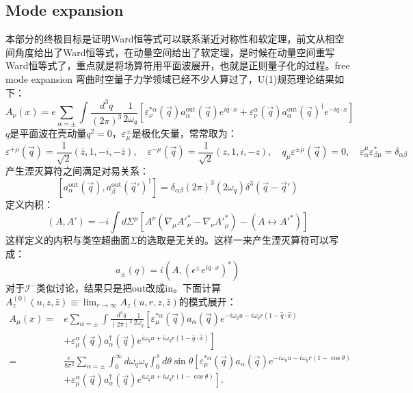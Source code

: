 \subsection{Mode expansion}
本部分的终极目标是证明Ward恒等式可以联系渐近对称性和软定理，前文从相空间角度给出了Ward恒等式，在动量空间给出了软定理，是时候在动量空间重写Ward恒等式了，重点就是将场算符用平面波展开，也就是正则量子化的过程。free mode expansion 弯曲时空量子力学领域已经不少人算过了，U(1)规范理论结果如下：
\begin{equation}
	A_{\nu}(x)=e\sum_{\alpha=\pm}\int\frac{d^3q}{\left(2\pi\right)^3}\frac{1}{2\omega_q}\left[\varepsilon_{\nu}^{*\alpha}(\vec{q})a_{\alpha}^{\mathrm{out}}(\vec{q})e^{iq\cdot x}+\varepsilon_{\nu}^{\alpha}(\vec{q})a_{\alpha}^{\mathrm{out}}(\vec{q})^\dagger e^{-iq\cdot x}\right]
\end{equation}
$q$是平面波在壳动量$q^2=0$，$\varepsilon^\pm_\mu$是极化矢量，常常取为：
\begin{equation}\label{eq:24.7}
	\varepsilon^{+\mu}(\vec{q})=\frac1{\sqrt{2}}\left(\bar{z},1,-i,-\bar{z}\right),\quad\varepsilon^{-\mu}(\vec{q})=\frac1{\sqrt{2}}\left(z,1,i,-z\right),\quad q_{\mu}\varepsilon^{\pm\mu}(\vec{q})=0,\quad\varepsilon_{\alpha}^{\mu}\varepsilon_{\beta\mu}^{*}=\delta_{\alpha\beta}
\end{equation}
产生湮灭算符之间满足对易关系：
\begin{equation}
	\left[a_\alpha^{\mathrm{out}}(\vec q),a_\beta^{\mathrm{out}}(\vec q')^\dagger\right]=\delta_{\alpha\beta}(2\pi)^3(2\omega_q)\delta^3\left(\vec q-\vec q'\right)
\end{equation}
定义内积：
\begin{equation}
	(A,A')=-i\int d\Sigma^{\mu}[A^{\nu}(\nabla_{\mu}{A'}_{\nu}^{*}-\nabla_{\nu}{A'}_{\mu}^{*})-(A\leftrightarrow {A'}^{*})]
\end{equation}
这样定义的内积与类空超曲面$\Sigma$的选取是无关的。这样一来产生湮灭算符可以写成：
\begin{equation}
	a_\pm(q)=i({A},(\epsilon^\pm e^{iq\cdot x})^*)
\end{equation}
对于$\mathcal{I}^-$类似讨论，结果只是把out改成in。下面计算$A_z^{(0)}(u,z,\bar{z})\equiv\lim_{r\to\infty}A_z(u,r,z,\bar{z})$的模式展开：
\begin{equation}
	\begin{aligned}
		A_{\mu}(x) =&e\sum_{\alpha=\pm}\int\frac{d^3q}{\left(2\pi\right)^3}\frac{1}{2\omega_q}\left[\varepsilon_{\mu}^{*\alpha}(\vec{q})a_{\alpha}(\vec{q})e^{-i\omega_qu-i\omega_qr(1-\hat{q}\cdot\hat{x})}\right. \\
		&\left.+\varepsilon_{\mu}^{\alpha}(\vec{q})a_{\alpha}^{\dagger}(\vec{q})e^{i\omega_{q}u+i\omega_{q}r(1-\hat{q}\cdot\hat{x})} \right]\\
		=&\frac e{8\pi^2}\sum_{\alpha=\pm}\int_0^\infty d\omega_q\omega_q\int_0^\pi d\theta\sin\theta\left[\varepsilon_\mu^{*\alpha}(\vec{q})a_\alpha(\vec{q})e^{-i\omega_qu-i\omega_qr(1-\cos\theta)}\right. \\
		&\left.+\varepsilon_{\mu}^{\alpha}(\vec{q})a_{\alpha}^{\dagger}(\vec{q})e^{i\omega_{q}u+i\omega_{q}r(1-\cos\theta)}\right].
	\end{aligned}
\end{equation}
